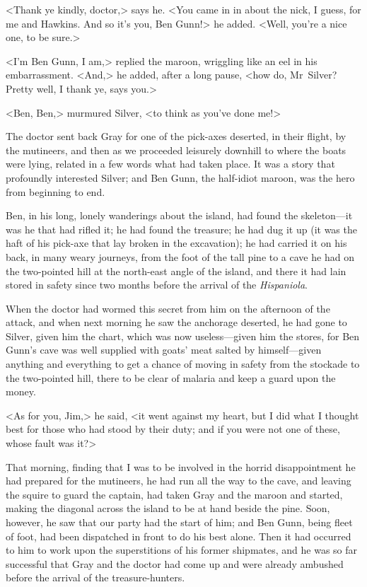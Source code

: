 <Thank ye kindly, doctor,> says he. <You came in in about the nick, I guess, for me and Hawkins. And so it's you, Ben Gunn!> he added. <Well, you're a nice one, to be sure.>

<I'm Ben Gunn, I am,> replied the maroon, wriggling like an eel in his embarrassment. <And,> he added, after a long pause, <how do, Mr~Silver? Pretty well, I thank ye, says you.>

<Ben, Ben,> murmured Silver, <to think as you've done me!>

The doctor sent back Gray for one of the pick-axes deserted, in their flight, by the mutineers, and then as we proceeded leisurely downhill to where the boats were lying, related in a few words what had taken place. It was a story that profoundly interested Silver; and Ben Gunn, the half-idiot maroon, was the hero from beginning to end.

Ben, in his long, lonely wanderings about the island, had found the skeleton—it was he that had rifled it; he had found the treasure; he had dug it up (it was the haft of his pick-axe that lay broken in the excavation); he had carried it on his back, in many weary journeys, from the foot of the tall pine to a cave he had on the two-pointed hill at the north-east angle of the island, and there it had lain stored in safety since two months before the arrival of the \textit{Hispaniola}.

When the doctor had wormed this secret from him on the afternoon of the attack, and when next morning he saw the anchorage deserted, he had gone to Silver, given him the chart, which was now useless—given him the stores, for Ben Gunn's cave was well supplied with goats' meat salted by himself—given anything and everything to get a chance of moving in safety from the stockade to the two-pointed hill, there to be clear of malaria and keep a guard upon the money.

<As for you, Jim,> he said, <it went against my heart, but I did what I thought best for those who had stood by their duty; and if you were not one of these, whose fault was it?>

That morning, finding that I was to be involved in the horrid disappointment he had prepared for the mutineers, he had run all the way to the cave, and leaving the squire to guard the captain, had taken Gray and the maroon and started, making the diagonal across the island to be at hand beside the pine. Soon, however, he saw that our party had the start of him; and Ben Gunn, being fleet of foot, had been dispatched in front to do his best alone. Then it had occurred to him to work upon the superstitions of his former shipmates, and he was so far successful that Gray and the doctor had come up and were already ambushed before the arrival of the treasure-hunters.

